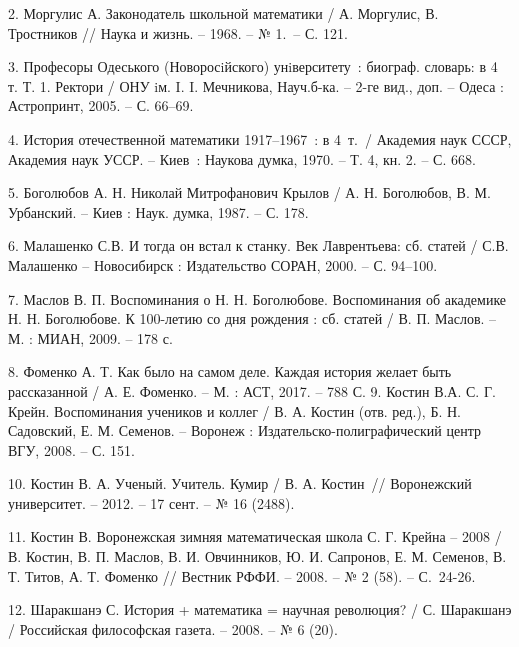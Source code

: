 2.	Моргулис А. Законодатель школьной математики / А. Моргулис, В. Тростников // Наука и жизнь. – 1968. – № 1.~– С. 121.

3.	Професоры Одеського (Новоросiйского) унiверситету~: биограф. словарь:  в 4 т. Т. 1. Ректори / ОНУ iм. I. I. Мечникова, Науч.б-ка. – 2-ге вид., доп. – Одеса : Астропринт, 2005. – С. 66–69.

4.	История отечественной математики 1917–1967~: в 4~т.~/ Академия наук СССР, Академия наук УССР. – Киев~: Наукова думка, 1970. – Т. 4, кн. 2. – С. 668.

5.	Боголюбов А. Н. Николай Митрофанович Крылов / А. Н. Боголюбов, В. М. Урбанский. – Киев : Наук. думка, 1987. – С. 178.

6.	Малашенко С.В. И тогда он встал к станку. Век Лаврентьева: сб. статей / С.В. Малашенко – Новосибирск : Издательство СОРАН, 2000. –  С. 94–100.

7.	Маслов В. П. Воспоминания о Н. Н. Боголюбове. Воспоминания об академике Н. Н. Боголюбове. К 100-летию со дня рождения : сб. статей / В. П. Маслов. – М. : МИАН, 2009. – 178 с.

8.	Фоменко А. Т. Как было на самом деле. Каждая история желает быть рассказанной / А. Е. Фоменко. – М. : АСТ, 2017. – 788 С.
9.	Костин В.А.  С. Г. Крейн. Воспоминания учеников и коллег / В. А. Костин (отв. ред.), Б. Н. Садовский, Е. М. Семенов. – Воронеж : Издательско-полиграфический центр ВГУ, 2008. – С. 151.

10.	Костин В. А. Ученый. Учитель. Кумир / В. А. Костин~// Воронежский университет. – 2012. – 17 сент. – № 16 (2488).

11.	Костин В. Воронежская зимняя математическая школа С. Г. Крейна – 2008 / В. Костин, В. П. Маслов, В. И. Овчинников, Ю. И. Сапронов, Е. М. Семенов, В. Т. Титов, А. Т. Фоменко // Вестник РФФИ. – 2008. – № 2 (58). – С.~24-26.

12.	Шаракшанэ С. История + математика = научная революция? / С. Шаракшанэ / Российская философская газета. – 2008. – № 6 (20).

